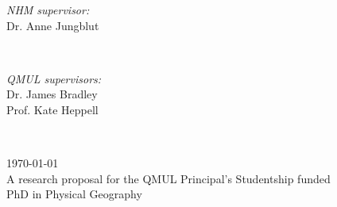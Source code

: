 \begin{titlepage}
\begin{minipage}{0.4\textwidth}
\begin{flushleft} \large
\emph{NHM supervisor:}\\
Dr. Anne Jungblut\\
\end{flushleft}
\end{minipage}
~
\begin{minipage}{0.4\textwidth}
\begin{flushright} \large
\emph{QMUL supervisors:} \\
Dr. James Bradley\\
Prof. Kate Heppell\\
\end{flushright}
\end{minipage}\\[3cm]
\makeatother


{\large \today}\\[2cm] %
{\large A research proposal for the QMUL Principal's Studentship funded }\\[0.5cm]
{\large {PhD in Physical Geography}}\\[0.5cm]


\vfill %

\end{titlepage}